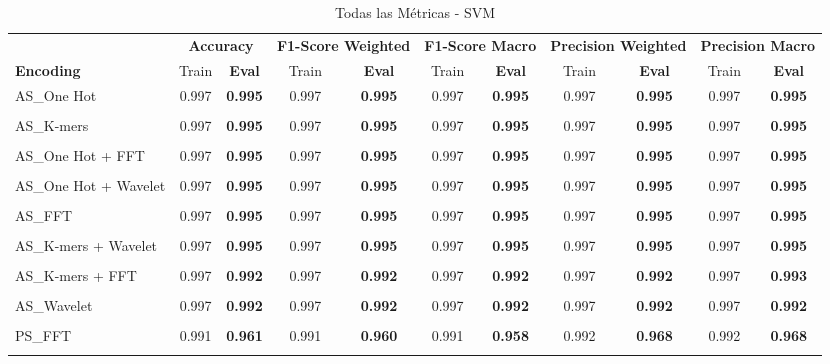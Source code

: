 \begin{table*}[htbp]
\centering
\caption{Todas las Métricas - SVM}
\label{tab:svm_complete}
\scriptsize
\begin{tabular}{lcccccccccc}
\toprule
& \multicolumn{2}{c}{\textbf{Accuracy}} & \multicolumn{2}{c}{\textbf{F1-Score Weighted}} & \multicolumn{2}{c}{\textbf{F1-Score Macro}} & \multicolumn{2}{c}{\textbf{Precision Weighted}} & \multicolumn{2}{c}{\textbf{Precision Macro}} \\
\cmidrule(lr){2-3} \cmidrule(lr){4-5} \cmidrule(lr){6-7} \cmidrule(lr){8-9} \cmidrule(lr){10-11}
\textbf{Encoding} & Train & \textbf{Eval} & Train & \textbf{Eval} & Train & \textbf{Eval} & Train & \textbf{Eval} & Train & \textbf{Eval} \\
\midrule
AS\_One Hot & 0.997 & \textbf{0.995} & 0.997 & \textbf{0.995} & 0.997 & \textbf{0.995} & 0.997 & \textbf{0.995} & 0.997 & \textbf{0.995} \\\\
AS\_K-mers & 0.997 & \textbf{0.995} & 0.997 & \textbf{0.995} & 0.997 & \textbf{0.995} & 0.997 & \textbf{0.995} & 0.997 & \textbf{0.995} \\\\
AS\_One Hot + FFT & 0.997 & \textbf{0.995} & 0.997 & \textbf{0.995} & 0.997 & \textbf{0.995} & 0.997 & \textbf{0.995} & 0.997 & \textbf{0.995} \\\\
AS\_One Hot + Wavelet & 0.997 & \textbf{0.995} & 0.997 & \textbf{0.995} & 0.997 & \textbf{0.995} & 0.997 & \textbf{0.995} & 0.997 & \textbf{0.995} \\\\
AS\_FFT & 0.997 & \textbf{0.995} & 0.997 & \textbf{0.995} & 0.997 & \textbf{0.995} & 0.997 & \textbf{0.995} & 0.997 & \textbf{0.995} \\\\
AS\_K-mers + Wavelet & 0.997 & \textbf{0.995} & 0.997 & \textbf{0.995} & 0.997 & \textbf{0.995} & 0.997 & \textbf{0.995} & 0.997 & \textbf{0.995} \\\\
AS\_K-mers + FFT & 0.997 & \textbf{0.992} & 0.997 & \textbf{0.992} & 0.997 & \textbf{0.992} & 0.997 & \textbf{0.992} & 0.997 & \textbf{0.993} \\\\
AS\_Wavelet & 0.997 & \textbf{0.992} & 0.997 & \textbf{0.992} & 0.997 & \textbf{0.992} & 0.997 & \textbf{0.992} & 0.997 & \textbf{0.992} \\\\
PS\_FFT & 0.991 & \textbf{0.961} & 0.991 & \textbf{0.960} & 0.991 & \textbf{0.958} & 0.992 & \textbf{0.968} & 0.992 & \textbf{0.968} \\\\

\end{tabular}
\end{table*}
